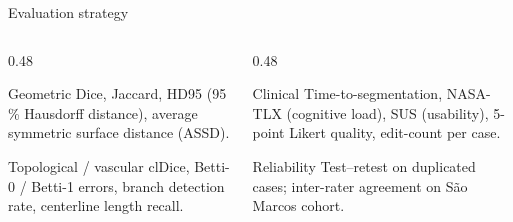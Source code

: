 \documentclass[aspectratio=169,11pt,xcolor=table]{beamer}
\begin{document}
\begin{frame}{Evaluation strategy}
\footnotesize
\begin{columns}[T]
\begin{column}{0.48\linewidth}
\begin{block}{Geometric}
\scriptsize
Dice, Jaccard, HD95 (95\,\% Hausdorff distance), average symmetric surface distance (ASSD).
\end{block}
\vspace{0.1cm}
\begin{block}{Topological / vascular}
\scriptsize
clDice, Betti-0 / Betti-1 errors, branch detection rate, centerline length recall.
\end{block}
\end{column}
\begin{column}{0.48\linewidth}
\begin{block}{Clinical}
\scriptsize
Time-to-segmentation, NASA-TLX (cognitive load), SUS (usability), 5-point Likert quality, edit-count per case.
\end{block}
\vspace{0.1cm}
\begin{block}{Reliability}
\scriptsize
Test--retest on duplicated cases; inter-rater agreement on São Marcos cohort.
\end{block}
\end{column}
\end{columns}
\end{frame}
\end{document}

